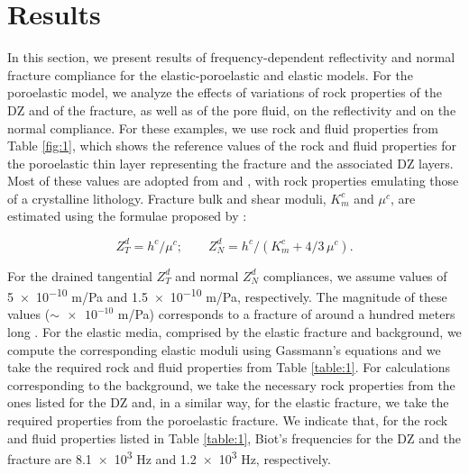 \documentclass[draft]{agujournal2019}
\begin{document}
\section{Results}
In  this section, we present results of frequency-dependent reflectivity and normal fracture compliance for the elastic-poroelastic and elastic models. For the poroelastic model, we analyze the effects of variations of rock properties of the DZ and of the fracture, as well as of the pore fluid, on the reflectivity and on the normal compliance.
For these examples, we use rock and fluid properties from Table \ref{fig:1}, which
shows the reference values of the rock and fluid properties for the poroelastic thin layer representing the fracture and the associated DZ layers. Most of these values are adopted from   and , with rock properties emulating those of a crystalline lithology. Fracture bulk and shear moduli, $K_{m}^c$ and $\mu^c$, are estimated using the formulae proposed by :
\begin{linenomath*}
\begin{equation} \label{Eq.24}
Z_T^d=h^c/\mu^c ; \qquad Z_N^d=h^c/(K_{m}^c + 4/3 \, \mu^c).
\end{equation}
\end{linenomath*}
For the drained tangential $Z_T^d$ and normal $Z_N^d$ compliances, we assume values of  \num{5e-10} m/Pa and \num{1.5e-10} m/Pa, respectively. The magnitude of these values ($\sim \num {e-10}$ m/Pa) corresponds to a fracture of around a hundred meters long \cite{Hobday2012}.
For the elastic media, comprised by the elastic fracture and background, we compute the corresponding elastic moduli using Gassmann's equations \cite{Gassmann1951} and we take the required rock and fluid properties from Table \ref{table:1}. For calculations corresponding to the background, we take the necessary rock properties from the ones listed for the DZ and, in a similar way, for the elastic fracture, we take the required properties from the poroelastic fracture. We indicate that, for the rock and fluid properties listed in Table \ref{table:1}, Biot's frequencies for the DZ and the fracture are \num{8.1e3} Hz and \num{1.2e3} Hz, respectively.
\end{document}
